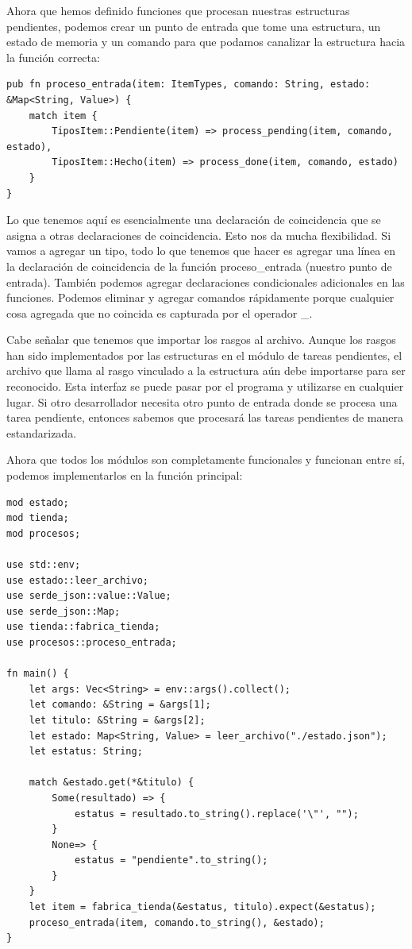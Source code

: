 Ahora que hemos definido funciones que procesan nuestras estructuras pendientes, podemos crear un punto de entrada que tome una estructura, un estado de memoria y un comando para que podamos canalizar la estructura hacia la función correcta:

\begin{lstlisting}
pub fn proceso_entrada(item: ItemTypes, comando: String, estado: &Map<String, Value>) {
	match item {
		TiposItem::Pendiente(item) => process_pending(item, comando, estado),
		TiposItem::Hecho(item) => process_done(item, comando, estado)
	}    
}
\end{lstlisting}

Lo que tenemos aquí es esencialmente una declaración de coincidencia que se asigna a otras declaraciones de coincidencia. Esto nos da mucha flexibilidad. Si vamos a agregar un tipo, todo lo que tenemos que hacer es agregar una línea en la declaración de coincidencia de la función proceso\_entrada (nuestro punto de entrada). También podemos agregar declaraciones condicionales adicionales en las funciones. Podemos eliminar y agregar comandos rápidamente porque cualquier cosa agregada que no coincida es capturada por el operador \_.

Cabe señalar que tenemos que importar los rasgos al archivo. Aunque los rasgos han sido implementados por las estructuras en el módulo de tareas pendientes, el archivo que llama al rasgo vinculado a la estructura aún debe importarse para ser reconocido. Esta interfaz se puede pasar por el programa y utilizarse en cualquier lugar. Si otro desarrollador necesita otro punto de entrada donde se procesa una tarea pendiente, entonces sabemos que procesará las tareas pendientes de manera estandarizada.

Ahora que todos los módulos son completamente funcionales y funcionan entre sí, podemos implementarlos en la función principal:

\begin{lstlisting}
mod estado;
mod tienda;
mod procesos;

use std::env;
use estado::leer_archivo;
use serde_json::value::Value;
use serde_json::Map;
use tienda::fabrica_tienda;
use procesos::proceso_entrada;

fn main() {
	let args: Vec<String> = env::args().collect();
	let comando: &String = &args[1];
	let titulo: &String = &args[2];
	let estado: Map<String, Value> = leer_archivo("./estado.json");
	let estatus: String;
	
	match &estado.get(*&titulo) {
		Some(resultado) => {
			estatus = resultado.to_string().replace('\"', "");
		}
		None=> {
			estatus = "pendiente".to_string();
		}
	}
	let item = fabrica_tienda(&estatus, titulo).expect(&estatus);
	proceso_entrada(item, comando.to_string(), &estado);
}
\end{lstlisting}

